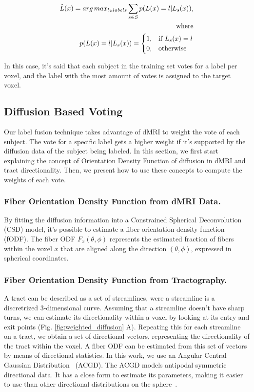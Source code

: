 \begin{equation}
\label{eq:mvoting}
\begin{aligned}
    \hat L(x) = arg\,max_{l \in labels} \sum_{s\in S} p(L(x) = l | L_s(x)),\\
    \text{where} \\
    p(L(x) = l | L_s(x)) =
    \begin{cases}
        1,& \text{if } L_s(x) = l \\
        0,& \text{otherwise}
    \end{cases}
\end{aligned}
\end{equation}

In this case, it's said that each subject in the training set votes for a label
per voxel, and the label with the most amount of votes is assigned to the target
voxel.

\subsection{Diffusion Based Voting}
Our label fusion technique takes advantage of dMRI to weight the vote of each
subject. The vote for a specific label gets a higher weight if it's supported
by the diffusion data of the subject being labeled. In this section, we first
start explaining the concept of Orientation Density Function of diffusion in
dMRI and tract directionality. Then, we present how to use these concepts to
compute the weights of each vote.

\subsubsection{Fiber Orientation Density Function from dMRI Data.}
By fitting the diffusion information into a Constrained Spherical Deconvolution (CSD)
model, it's possible to estimate a fiber orientation density function\cite{Tournier2004} (fODF). 
The fiber ODF $F_x(\theta, \phi)$ represents the estimated fraction of fibers
within the voxel $x$ that are aligned along the direction $(\theta, \phi)$,
expressed in spherical coordinates.

\subsubsection{Fiber Orientation Density Function from Tractography.}
A tract can be described as a set of streamlines, were a streamline is a
discretrized 3-dimensional curve. Assuming that a streamline doesn't have sharp
turns, we can estimate its directionality within a voxel by looking at its
entry and exit points (Fig. \ref{fig:weighted_diffusion} A). Repeating this for each streamline
on a tract, we obtain a set of directional vectors, representing the directionality
of the tract within the voxel. A fiber ODF can be estimated from this set of
vectors by means of directional statistics. In this work, we use an
Angular Central Gaussian Distribution~\cite{Mardia1999} (ACGD). The ACGD models
antipodal symmetric directional data. It has a close form to estimate its
parameters, making it easier to use than other directional distributions on the
sphere~\cite{Mardia1999}.
    
